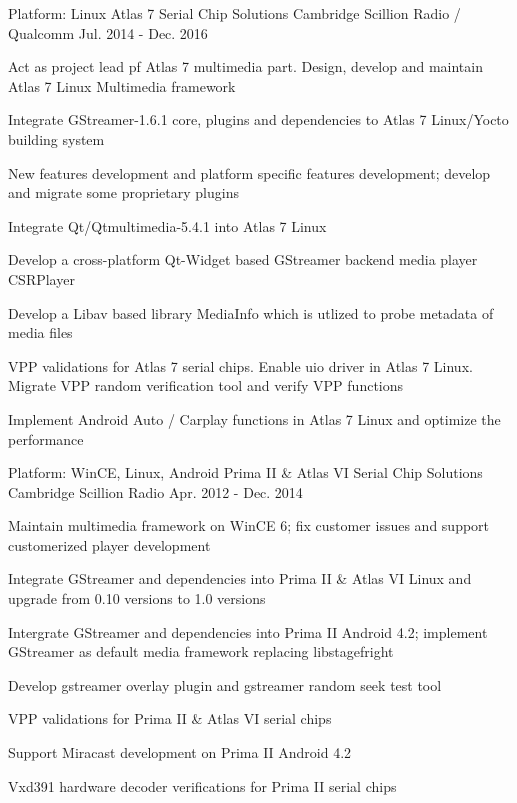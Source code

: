 \begin{cventries}
  \cventry
    {Platform: Linux} %
    {Atlas 7 Serial Chip Solutions} %
    {Cambridge Scillion Radio / Qualcomm} %
    {Jul. 2014 - Dec. 2016} %
    {
      \begin{cvitems} %
        \item {Act as project lead pf Atlas 7 multimedia part. Design, develop and maintain Atlas 7 Linux Multimedia framework}
        \item {Integrate GStreamer-1.6.1 core, plugins and dependencies to Atlas 7 Linux/Yocto building system}
        \item {New features development and platform specific features development; develop and migrate some proprietary plugins}
        \item {Integrate Qt/Qtmultimedia-5.4.1 into Atlas 7 Linux}
        \item {Develop a cross-platform Qt-Widget based GStreamer backend media player CSRPlayer}
        \item {Develop a Libav based library MediaInfo which is utlized to probe metadata of media files}
        \item {VPP validations for Atlas 7 serial chips. Enable uio driver in Atlas 7 Linux. Migrate VPP random verification tool and verify VPP functions}
		\item {Implement Android Auto / Carplay functions in Atlas 7 Linux and optimize the performance}
      \end{cvitems}
    }

  \cventry
    {Platform: WinCE, Linux, Android} %
    {Prima II \& Atlas VI Serial Chip Solutions} %
    {Cambridge Scillion Radio} %
    {Apr. 2012 - Dec. 2014} %
    {
      \begin{cvitems} %
        \item {Maintain multimedia framework on WinCE 6; fix customer issues and support customerized player development}
        \item {Integrate GStreamer and dependencies into Prima II \& Atlas VI Linux and upgrade from 0.10 versions to 1.0 versions}
        \item {Intergrate GStreamer and dependencies into Prima II Android 4.2; implement GStreamer as default media framework replacing libstagefright}
		\item {Develop gstreamer overlay plugin and gstreamer random seek test tool}
        \item {VPP validations for Prima II \& Atlas VI serial chips}
		\item {Support Miracast development on Prima II Android 4.2}
        \item {Vxd391 hardware decoder verifications for Prima II serial chips}
      \end{cvitems}
    }


\end{cventries}
